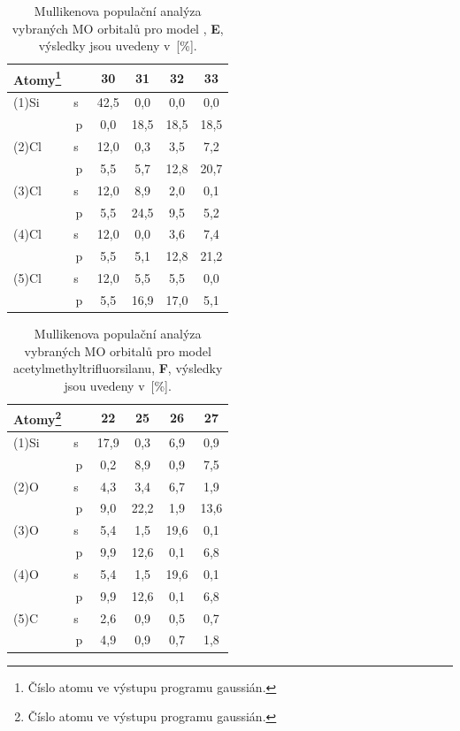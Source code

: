 \documentclass[
digital, %
table,   %
lof,     %
lot,     %
oneside,
]{fithesis3}
\begin{document}
\begin{table}[H] \begin{minipage}{\textwidth}
\begin{center}
\caption{Mullikenova populační analýza vybraných MO orbitalů pro model , \textbf{E}, výsledky jsou uvedeny v~[\%].}
\begin{tabular}{|l|c|c|c|c|c|}
\hline
Atomy\footnote{Číslo atomu ve výstupu programu gaussián.} \label{MP_si_cl4} &  & 30 & 31 & 32 & 33 \\ \hline
(1)Si & s~& 42,5  & 0,0  & 0,0  & 0,0  \\ \hline
& p & 0,0  & 18,5  & 18,5  & 18,5  \\ \hline
(2)Cl & s~& 12,0  & 0,3  & 3,5  & 7,2  \\ \hline
& p & 5,5  & 5,7  & 12,8  & 20,7  \\ \hline
(3)Cl & s~& 12,0  & 8,9  & 2,0  & 0,1  \\ \hline
& p & 5,5  & 24,5  & 9,5  & 5,2  \\ \hline
(4)Cl & s~& 12,0  & 0,0  & 3,6  & 7,4  \\ \hline
& p & 5,5  & 5,1  & 12,8  & 21,2  \\ \hline
(5)Cl & s~& 12,0  & 5,5  & 5,5  & 0,0  \\ \hline
& p & 5,5  & 16,9  & 17,0  & 5,1  \\ \hline
\end{tabular}\end{center}\end{minipage}\end{table}


\begin{table}[H] \begin{minipage}{\textwidth}
\caption{Mullikenova populační analýza vybraných MO orbitalů pro model acetylmethyltrifluorsilanu, \textbf{F}, výsledky jsou uvedeny v~[\%].}
\begin{center}
\begin{tabular}{|l|c|c|c|c|c|}
\hline
Atomy\footnote{Číslo atomu ve výstupu programu gaussián.}\label{acetylmethyltrifluorsilan_MPA}&  & 22 & 25 & 26 & 27 \\ \hline
(1)Si & s~& 17,9  & 0,3  & 6,9  & 0,9  \\ \hline
& p & 0,2  & 8,9  & 0,9  & 7,5  \\ \hline
(2)O & s~& 4,3  & 3,4  & 6,7  & 1,9  \\ \hline
& p & 9,0  & 22,2  & 1,9  & 13,6  \\ \hline
(3)O & s~& 5,4  & 1,5  & 19,6  & 0,1  \\ \hline
& p & 9,9  & 12,6  & 0,1  & 6,8  \\ \hline
(4)O & s~& 5,4  & 1,5  & 19,6  & 0,1  \\ \hline
& p & 9,9  & 12,6  & 0,1  & 6,8  \\ \hline
(5)C & s~& 2,6  & 0,9  & 0,5  & 0,7  \\ \hline
& p & 4,9  & 0,9  & 0,7  & 1,8  \\ \hline
\end{tabular}\end{center}\end{minipage}\end{table}
\end{document}
